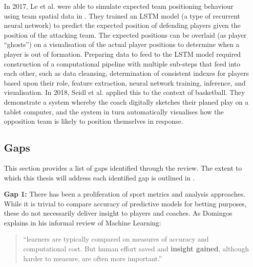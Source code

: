 In 2017, Le et al. \cite{LeHoang2017} were able to simulate expected team positioning behaviour using team spatial data in \soccer{}. They trained an LSTM model (a type of recurrent neural network) to predict the expected position of defending players given the position of the attacking team. The expected positions can be overlaid (as player ``ghosts'') on a visualisation of the actual player positions to determine when a player is out of formation. Preparing data to feed to the LSTM model required construction of a computational pipeline with multiple sub-steps that feed into each other, such as data cleansing, determination of consistent indexes for players based upon their role, feature extraction, neural network training, inference, and visualisation. In 2018, Seidl et al. \cite{Seidl2018} applied this to the context of basketball. They demonstrate a system whereby the coach digitally sketches their planed play on a tablet computer, and the system in turn automatically visualises how the opposition team is likely to position themselves in response.


\subsection{Gaps}\label{sec:gaps}

This section provides a list of gaps identified through the review. The extent to which this thesis will address each identified gap is outlined in .


\textbf{Gap 1:} There has been a proliferation of sport metrics and analysis approaches. While it is trivial to compare accuracy of predictive models for betting purposes, these do not necessarily deliver insight to players and coaches. As Domingos \cite{Domingos2012} explains in his informal review of Machine Learning:

\begin{quote}
``learners are typically compared on measures of accuracy and
computational cost. But human effort saved and \textbf{insight gained},
although harder to measure, are often more important.'' \cite{Domingos2012}
\end{quote}


